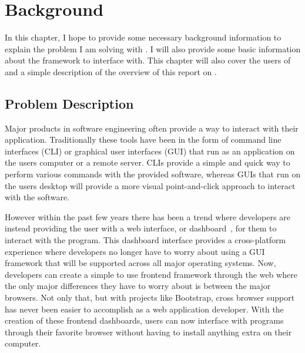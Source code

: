 
\cleardoublepage

\chapter{Background}
\label{makereference1}

In this chapter, I hope to provide some necessary background information to explain the problem I am solving with \projectName{}. I will also provide some basic information about the \ancor{} framework to interface with. This chapter will also cover the users of \projectName{} and a simple description of the overview of this report on \projectName{}.

\section{Problem Description}
\label{makereference1.2}

Major products in software engineering often provide a way to interact with their application. Traditionally these tools have been in the form of command line interfaces (CLI) or graphical user interfaces (GUI) that run as an application on the users computer or a remote server. CLIs provide a simple and quick way to perform various commands with the provided software, whereas GUIs that run on the users desktop will provide a more visual point-and-click approach to interact with the software.

However within the past few years there has been a trend where developers are instead providing the user with a web interface, or dashboard~\cite{GEN:Few:2006}, for them to interact with the program. This dashboard interface provides a cross-platform experience where developers no longer have to worry about using a GUI framework that will be supported across all major operating systems. Now, developers can create a simple to use frontend framework through the web where the only major differences they have to worry about is between the major browsers. Not only that, but with projects like Bootstrap, cross browser support has never been easier to accomplish as a web application developer. With the creation of these frontend dashboards, users can now interface with programs through their favorite browser without having to install anything extra on their computer.

